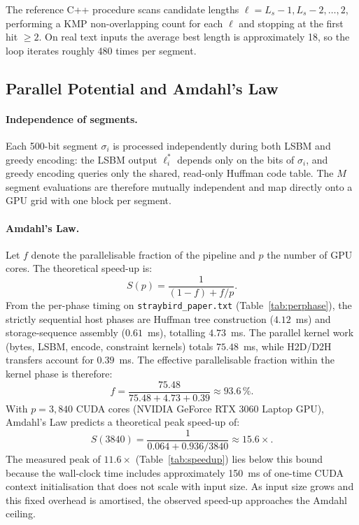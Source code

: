 \documentclass[runningheads]{llncs}
\begin{document}
The reference C++ procedure scans candidate lengths
$\ell = L_s - 1, L_s - 2, \ldots, 2$, performing a
KMP non-overlapping count for each $\ell$ and stopping at the first hit
$\geq 2$.  On real text inputs the average best length is approximately
18, so the loop iterates roughly 480 times per segment.

\subsection{Parallel Potential and Amdahl's Law}
\label{sec:amdahl}

\paragraph{Independence of segments.}
Each 500-bit segment $\sigma_i$ is processed independently during both
LSBM and greedy encoding: the LSBM output $\ell^*_i$ depends only on the
bits of $\sigma_i$, and greedy encoding queries only the shared,
read-only Huffman code table.  The $M$ segment evaluations are therefore
mutually independent and map directly onto a GPU grid with one block per
segment.

\paragraph{Amdahl's Law.}
Let $f$ denote the parallelisable fraction of the pipeline and $p$ the
number of GPU cores.  The theoretical speed-up is:
\[
  S(p) = \frac{1}{(1 - f) + f/p}.
\]
From the per-phase timing on \texttt{straybird\_paper.txt}
(Table~\ref{tab:perphase}), the strictly sequential host phases are
Huffman tree construction ($4.12$~ms) and storage-sequence assembly
($0.61$~ms), totalling $4.73$~ms.  The parallel kernel work (bytes,
LSBM, encode, constraint kernels) totals $75.48$~ms, while H2D/D2H
transfers account for $0.39$~ms.  The effective parallelisable fraction
within the kernel phase is therefore:
\[
  f = \frac{75.48}{75.48 + 4.73 + 0.39} \approx 93.6\,\%.
\]
With $p = 3{,}840$ CUDA cores (NVIDIA GeForce RTX 3060 Laptop GPU),
Amdahl's Law predicts a theoretical peak speed-up of:
\[
  S(3840) = \frac{1}{0.064 + 0.936/3840} \approx 15.6\times.
\]
The measured peak of $11.6\times$ (Table~\ref{tab:speedup}) lies below
this bound because the wall-clock time includes approximately 150~ms of
one-time CUDA context initialisation that does not scale with input
size.  As input size grows and this fixed overhead is amortised, the
observed speed-up approaches the Amdahl ceiling.
\end{document}
